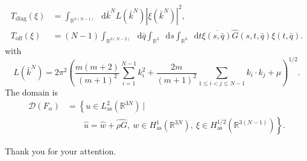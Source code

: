 \documentclass{beamer}[10]
\newcommand{\abs}[1]{\left\lvert #1 \right\rvert}
\newcommand*\diff{\mathop{}\!\mathrm{d}}
\newcommand{\R}{\mathbb{R}}
\begin{document}
\begin{frame}
	\begin{equation}
	\begin{aligned}
	T_{\text{diag}}(\xi)&=\int_{\R^{3(N-1)}}\diff \bar{k}^N L(\bar{k}^N) \abs{\xi(\bar{k}^N)}^2,\\
	T_{\text{off}}(\xi)&=(N-1)\int_{\R^{3(N-2)}}\diff \bar{q}\int_{\R^3}\diff s\int_{\R^3}\diff t \overline{\xi(s,\bar{q})}\hat{G}(s,t,\bar{q})\xi(t,\bar{q}).
	\end{aligned}
	\end{equation} 
	with \small\begin{equation}
	L(\bar{k}^N)=2\pi^2\left(\frac{m(m+2)}{(m+1)^2}\sum_{i=1}^{N-1}k_i^2+\frac{2m}{(m+1)^2}\sum_{1\leq i<j\leq N-1}k_i\cdot k_j+\mu\right)^{1/2}.
	\end{equation}
	The domain is \begin{equation}
	\begin{aligned}
	\mathscr{D}(F_\alpha)&=\left\{u\in L_{\text{as}}^2(\R^{3N})\ \Big\vert\ \right.\\ &\qquad \left.\hat{u}=\hat{w}+\widehat{\rho G},\ w\in H_{\text{as}}^1(\R^{3N}),\ \xi\in H_{\text{as}}^{1/2}(\R^{3(N-1)}) \right\}.
	\end{aligned}
	\end{equation}
\end{frame}
\begin{frame}
	\centering
	\Large Thank you for your attention.\\
\end{frame}		
\end{document}
